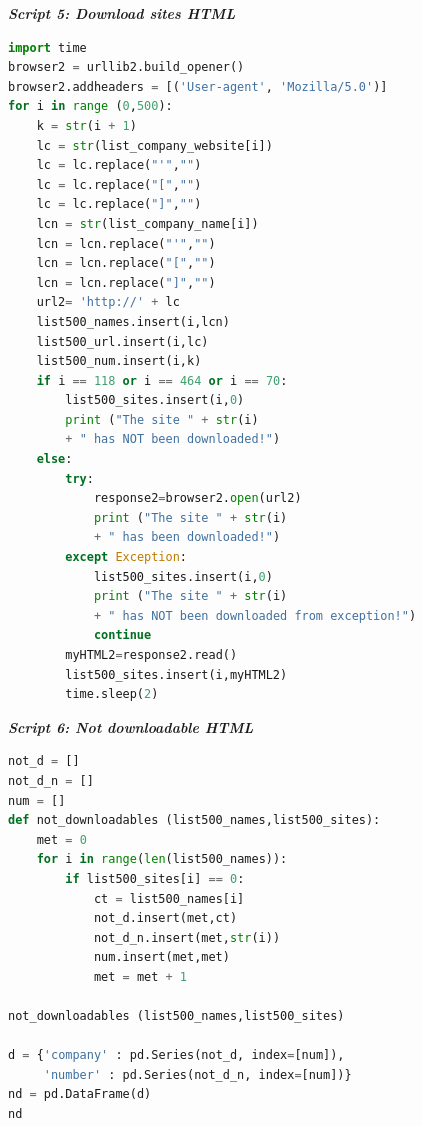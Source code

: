 \documentclass{article}
\begin{document}
\begin{center}
\textit{\textbf{Script 5: Download sites HTML}}\label{p5}
\end{center}
\begin{lstlisting}[language=Python]
import time
browser2 = urllib2.build_opener()
browser2.addheaders = [('User-agent', 'Mozilla/5.0')]
for i in range (0,500):
    k = str(i + 1)
    lc = str(list_company_website[i])
    lc = lc.replace("'","")
    lc = lc.replace("[","")
    lc = lc.replace("]","")
    lcn = str(list_company_name[i])
    lcn = lcn.replace("'","")
    lcn = lcn.replace("[","")
    lcn = lcn.replace("]","")
    url2= 'http://' + lc
    list500_names.insert(i,lcn)
    list500_url.insert(i,lc)
    list500_num.insert(i,k)
    if i == 118 or i == 464 or i == 70:
        list500_sites.insert(i,0)  
        print ("The site " + str(i) 
        + " has NOT been downloaded!")
    else:
        try:
            response2=browser2.open(url2)
            print ("The site " + str(i) 
            + " has been downloaded!")
        except Exception:
            list500_sites.insert(i,0)
            print ("The site " + str(i) 
            + " has NOT been downloaded from exception!")           
            continue 
        myHTML2=response2.read()
        list500_sites.insert(i,myHTML2)        
        time.sleep(2)         
\end{lstlisting}

\begin{center}
\textit{\textbf{Script 6: Not downloadable HTML}}\label{p6}
\end{center}
\begin{lstlisting}[language=Python]
not_d = []
not_d_n = []
num = []
def not_downloadables (list500_names,list500_sites):
    met = 0       
    for i in range(len(list500_names)):       
        if list500_sites[i] == 0:
            ct = list500_names[i]
            not_d.insert(met,ct)
            not_d_n.insert(met,str(i))
            num.insert(met,met)
            met = met + 1

not_downloadables (list500_names,list500_sites)

d = {'company' : pd.Series(not_d, index=[num]),
     'number' : pd.Series(not_d_n, index=[num])}
nd = pd.DataFrame(d)    
nd
\end{lstlisting}
\end{document}
